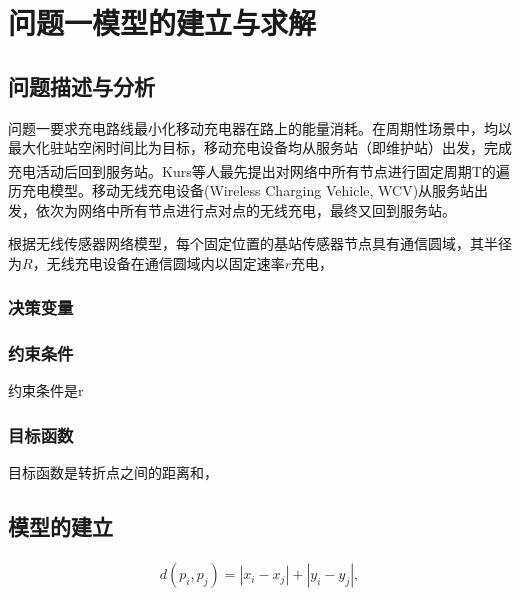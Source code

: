 \documentclass{whutmod}
\newcommand{\upcite}[1]{\textsuperscript{\cite{#1}}}
\begin{document}
	\section{问题一模型的建立与求解}
		\subsection{问题描述与分析}
			问题一要求充电路线最小化移动充电器在路上的能量消耗。在周期性场景中，均以最大化驻站空闲时间比为目标，移动充电设备均从服务站（即维护站）出发，完成充电活动后回到服务站。Kurs等人\upcite{4}最先提出对网络中所有节点进行固定周期T的遍历充电模型。移动无线充电设备(Wireless Charging Vehicle, WCV)从服务站出发，依次为网络中所有节点进行点对点的无线充电，最终又回到服务站。
			
			根据无线传感器网络模型，每个固定位置的基站传感器节点具有通信圆域，其半径为$R$，无线充电设备在通信圆域内以固定速率$r$充电，
			\subsubsection{决策变量}
			
			\subsubsection{约束条件}
			约束条件是r
			\subsubsection{目标函数}
			目标函数是转折点之间的距离和，
		\subsection{模型的建立}
			
			\begin{gather*}
			d(p_i,p_j)=\left | x_i-x_j \right |+\left | y_i-y_j \right | ,
			\end{gather*}
		
		
\end{document}
